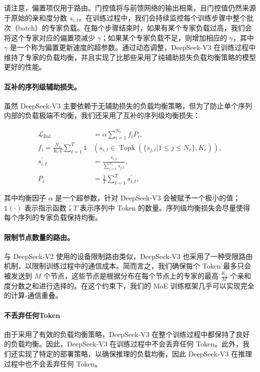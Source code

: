 \documentclass[lang=cn,a4paper,newtx]{elegantpaper}
\newcommand{\dsvii}{DeepSeek-V2}
\newcommand{\dsviii}{DeepSeek-V3}
\begin{document}
请注意，偏置项仅用于路由。门控值将与前馈网络的输出相乘，且门控值仍然来源于原始的亲和度分数 $s_{i,t}$。在训练过程中，我们会持续监控每个训练步骤中整个批次（batch）的专家负载。在每个步骤结束时，如果有某个专家负载过高，我们会将这个专家对应的偏置项减少 $\gamma$；如果某个专家负载不足，则增加相应的 $\gamma$，其中 $\gamma$ 是一个称为偏置更新速度的超参数。通过动态调整，\dsviii{} 在训练过程中维持了专家的负载均衡，并且实现了比那些采用了纯辅助损失负载均衡策略的模型更好的性能。

\paragraph{互补的序列级辅助损失。}
虽然 \dsviii{} 主要依赖于无辅助损失的负载均衡策略，但为了防止单个序列内部的负载极端不均衡，我们还采用了互补的序列级均衡损失：

\begin{align}
    \mathcal{L}_{\mathrm{Bal}} & = \alpha \sum_{i=1}^{N_r}{f_i P_i}, \\
    f_i = \frac{N_r}{K_r T} \sum_{t=1}^{T} \mathds{1} & \left( s_{i,t} \in \operatorname{Topk} ( \{ s_{j, t} | 1 \leq j \leq N_r \}, K_{r} ) \right), \\
    s^{\prime}_{i,t} & = \frac{s_{i,t}}{\sum_{j=1}^{N_r} s_{j,t}}, \\
    P_i & = \frac{1}{T} \sum_{t=1}^{T}{s^{\prime}_{i,t}},
\end{align}

其中均衡因子 $\alpha$ 是一个超参数，针对 \dsviii{} 会被赋予一个极小的值；$\mathds{1}(\cdot)$ 表示指示函数；$T$ 表示序列中 Token 的数量。序列级均衡损失会尽量使得每个序列的专家负载保持均衡。

\paragraph{限制节点数量的路由。}
与 \dsvii{} 使用的设备限制路由类似，\dsviii{} 也采用了一种受限路由机制，以限制训练过程中的通信成本。简而言之，我们确保每个 Token 最多只会被发送到 $M$ 个节点，这些节点是根据分布在每个节点上的专家的最高 $\frac{K_r}{M}$ 个亲和度分数之和进行选择的。在这个约束下，我们的 MoE 训练框架几乎可以实现完全的计算-通信重叠。

\paragraph{不丢弃任何Token}
由于采用了有效的负载均衡策略，\dsviii{} 在整个训练过程中都保持了良好的负载均衡。因此，\dsviii{} 在训练过程中不会丢弃任何 Token。此外，我们还实现了特定的部署策略，以确保推理的负载均衡，因此 \dsviii{} 在推理过程中也不会丢弃任何 Token。
\end{document}
